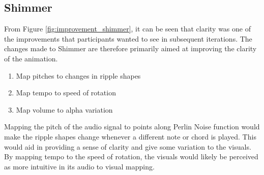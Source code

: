 \documentclass[../initial_thesis.tex]{subfiles}
\begin{document}
\subsection{Shimmer}
From Figure \ref{fig:improvement_shimmer}, it can be seen that clarity was one of the improvements that participants wanted to see in subsequent iterations. The changes made to Shimmer are therefore primarily aimed at improving the clarity of the animation.
\begin{enumerate}
\item {Map pitches to changes in ripple shapes}
\item {Map tempo to speed of rotation}
\item {Map volume to alpha variation}
\end{enumerate}
Mapping the pitch of the audio signal to points along Perlin Noise function would make the ripple shapes change whenever a different note or chord is played. This would aid in providing a sense of clarity and give some variation to the visuals. By mapping tempo to the speed of rotation, the visuals would likely be perceived as more intuitive in its audio to visual mapping.
\end{document}
